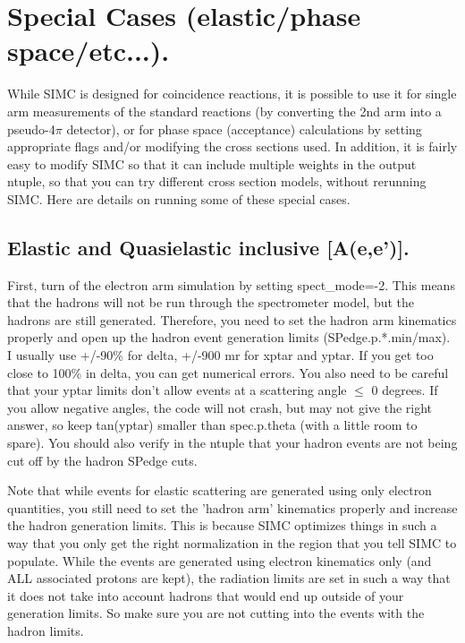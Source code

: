 \section{Special Cases (elastic/phase space/etc...).}

While SIMC is designed for coincidence reactions, it is possible to use it for
single arm measurements of the standard reactions (by converting the 2nd
arm into a pseudo-4$\pi$ detector), or for phase space (acceptance)
calculations by setting appropriate flags and/or modifying the cross sections
used.  In addition, it is fairly easy to modify SIMC so that it can include
multiple weights in the output ntuple, so that you can try different cross
section models, without rerunning SIMC.  Here are details on running some of
these special cases.

\subsection{Elastic and Quasielastic inclusive [A(e,e')].}

First, turn of the electron arm simulation by setting spect\_mode=-2.  This
means that the hadrons will not be run through the spectrometer model, but
the hadrons are still generated.  Therefore, you need to set the hadron arm
kinematics properly and open up the hadron event generation limits
(SPedge.p.*.min/max).  I usually use +/-90\% for delta, +/-900 mr for xptar and
yptar.  If you get too close to 100\% in delta, you can get numerical errors. 
You also need to be careful that your yptar limits don't allow events at a
scattering angle $\leq$ 0 degrees.  If you allow negative angles, the code will
not crash, but may not give the right answer, so keep tan(yptar) smaller than
spec.p.theta (with a little room to spare).  You should also verify in the
ntuple that your hadron events are not being cut off by the hadron SPedge cuts.

	Note that while events for elastic scattering are generated using
only electron quantities, you still need to set the 'hadron arm' kinematics
properly and increase the hadron generation limits.  This is because SIMC 
optimizes things in such a way that you only get the right normalization 
in the region that you tell SIMC to populate.  While the events are generated
using electron kinematics only (and ALL associated protons are kept), the
radiation limits are set in such a way that it does not take into account
hadrons that would end up outside of your generation limits.  So make sure
you are not cutting into the events with the hadron limits.


